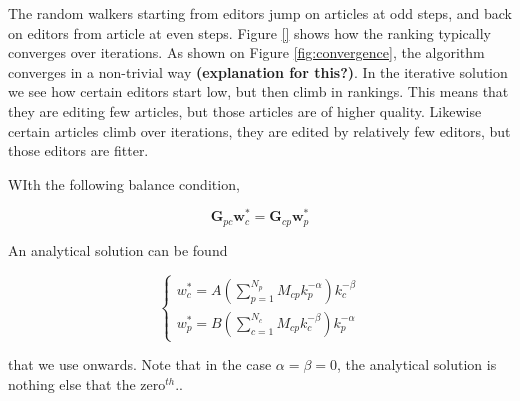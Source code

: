 The random walkers starting from editors jump on articles at odd steps, and back on editors from article at even steps. Figure \ref{} shows how the ranking typically converges over iterations. As shown on Figure \ref{fig:convergence}, the algorithm converges in a non-trivial way {\bf (explanation for this?)}. In the iterative solution we see how certain editors start low, but then climb in rankings. This means that they are editing few articles, but those articles are of higher quality. Likewise certain articles climb over iterations, they are edited by relatively few editors, but those editors are fitter.

WIth the following balance condition,

\begin{equation}
\mathbf{G}_{pc} \mathbf{w}^*_c = \mathbf{G}_{cp} \mathbf{w}^*_p
\end{equation}

An analytical solution can be found \cite{caldarelli}

\begin{equation}
\begin{cases}
 w^*_c = A(\sum^{N_p}_{p=1} M_{cp}k_p^{-\alpha})k_c^{-\beta} \\
w^*_p = B(\sum^{N_c}_{c=1} M_{cp}k_c^{-\beta})k_p^{-\alpha}
\end{cases}
\end{equation}



that we use onwards. Note that in the case $\alpha = \beta = 0$, the analytical solution is nothing else that the zero$^{th}$..

